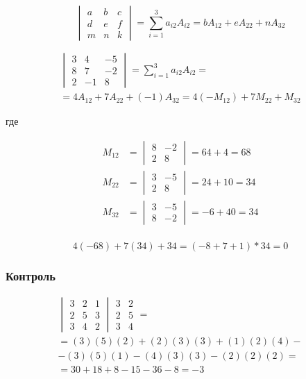\documentclass{article}
\begin{document}
\[
\begin{vmatrix}
	a & b & c \\
	d & e & f \\
	m & n & k	
\end{vmatrix} =
\sum_{i=1}^{3} a_{i2} A_{i2} =
bA_{12} + eA_{22} + nA_{32}
\]

\begin{gather*}
	\begin{vmatrix}
		3 & 4 & -5 \\
		8 & 7 & -2 \\
		2 & -1 & 8
	\end{vmatrix} = \sum_{i=1}^{3} a_{i2} A_{i2} = \\
	= 4A_{12} + 7A_{22} + (-1)A_{32} =
	4(-M_{12}) + 7M_{22} + M_{32}		
\end{gather*}

где

\begin{align*}
	M_{12} &= 
	\begin{vmatrix}
		8 & -2 \\
		2 & 8
	\end{vmatrix}
	= 64 + 4 = 68 \\
	M_{22} &=
	\begin{vmatrix}
		3 & -5 \\
		2 & 8
	\end{vmatrix}
	= 24 + 10 = 34 \\
	M_{32} &=
	\begin{vmatrix}
		3 & -5 \\
		8 & -2
	\end{vmatrix}
	= -6 + 40 = 34 \\
\end{align*}

\[
	4(-68) + 7(34) + 34 = (-8 + 7 + 1) * 34 = 0
\]

\subsubsection{Контроль}

\begin{gather*}
	\begin{vmatrix}
		3 & 2 & 1 \\
		2 & 5 & 3 \\
		3 & 4 & 2
	\end{vmatrix}
	\begin{matrix}
		3 & 2 \\
		2 & 5 \\
		3 & 4
	\end{matrix} = \\
	= (3)(5)(2) + (2)(3)(3) + (1)(2)(4) - \\
	- (3)(5)(1) - (4)(3)(3) - (2)(2)(2) = \\
	= 30 + 18 + 8 - 15 - 36 - 8 = -3
\end{gather*}
\end{document}
